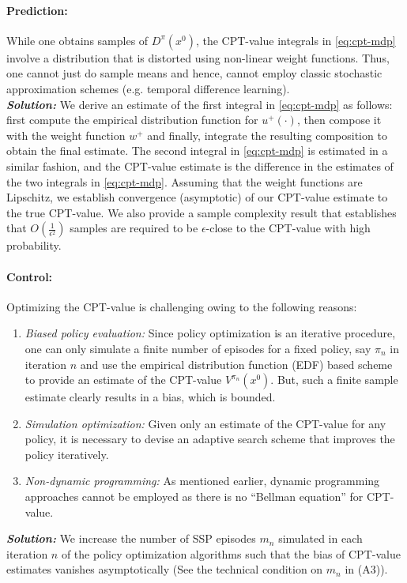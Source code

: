 \documentclass[11pt,letterpaper,english]{article}
\begin{document}
\paragraph{Prediction:} While one obtains samples of $D^\pi(x^0)$, the CPT-value integrals in \eqref{eq:cpt-mdp} involve a distribution that is distorted using non-linear weight functions. Thus, one cannot just do sample means and hence, cannot employ classic stochastic approximation schemes (e.g. temporal difference learning). \\
\textit{\textbf{Solution:}} 
We derive an estimate of the first integral in \eqref{eq:cpt-mdp} as follows:
first compute the empirical distribution function for $u^+(\cdot)$, then compose it with the weight function $w^+$ and finally, integrate the resulting composition to obtain the final estimate. The second integral in \eqref{eq:cpt-mdp} is estimated in a similar fashion, and the CPT-value estimate is the difference in the estimates of the two integrals in \eqref{eq:cpt-mdp}.
Assuming that the weight functions are Lipschitz,  we establish convergence (asymptotic) of our CPT-value estimate to the true CPT-value. We also provide a sample complexity result that establishes that  $O\left(\frac1{\epsilon^2}\right)$ samples are required to be $\epsilon$-close to the CPT-value with high probability. 
\paragraph{Control:} Optimizing the CPT-value is challenging owing to the following reasons:
\begin{enumerate}[\bfseries (i)]
\item \textit{Biased policy evaluation:} Since policy optimization is an iterative procedure, one can only simulate a finite number of episodes for a fixed policy, say $\pi_n$ in iteration $n$ and use the empirical distribution function (EDF) based scheme to provide an estimate of the CPT-value $V^{\pi_n}(x^0)$. But, such a finite sample estimate clearly results in a bias, which is bounded.
\item \textit{Simulation optimization:} Given only an estimate of the CPT-value for any policy, it is necessary to devise an adaptive search scheme that improves the policy iteratively. 
\item \textit{Non-dynamic programming:} As mentioned earlier, dynamic programming approaches cannot be employed as there is no ``Bellman equation'' for CPT-value.  
\end{enumerate}
\textit{\textbf{Solution:}} 
We increase the number of SSP episodes $m_n$ simulated in each iteration $n$ of the policy optimization algorithms such that the bias of CPT-value estimates vanishes asymptotically (See the technical condition on $m_n$ in (A3)).
\end{document}

